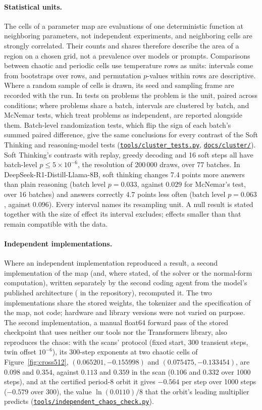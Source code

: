 \documentclass[11pt,letterpaper]{article}
\newcommand{\repourl}{https://github.com/tdj28/neural-shrimp}
\newcommand{\reporef}{arxiv-v1}
\newcommand{\repo}[1]{\href{\repourl/blob/\reporef/#1}{\nolinkurl{#1}}}
\begin{document}
\paragraph{Statistical units.} The cells of a parameter map are evaluations of one deterministic function at
neighboring parameters, not independent experiments, and neighboring cells are strongly correlated. Their counts and
shares therefore describe the area of a region on a chosen grid, not a prevalence over models or prompts. Comparisons
between chaotic and periodic cells use temperature rows as units: intervals come from bootstraps over rows, and
permutation $p$-values within rows are descriptive. Where a random sample of cells is drawn, its seed and sampling
frame are recorded with the run. In tests on problems the problem is the unit, paired across conditions; where
problems share a batch, intervals are clustered by batch, and McNemar tests, which treat problems as independent, are
reported alongside them. Batch-level randomization tests, which flip the sign of each batch's summed paired
difference, give the same conclusions for every contrast of the Soft Thinking and reasoning-model tests
(\repo{tools/cluster_tests.py}, \repo{docs/cluster/}). Soft Thinking's contrasts with replay, greedy decoding and
16 soft steps all have batch-level $p\le5\times10^{-6}$, the resolution of 200\,000 draws, over 77 batches. In
DeepSeek-R1-Distill-Llama-8B, soft thinking changes 7.4 points more answers than plain reasoning (batch level
$p=0.033$, against $0.029$ for McNemar's test, over 16 batches) and answers correctly 4.7 points less often (batch
level $p=0.063$, against $0.096$). Every interval names its resampling unit. A null result is stated together with the size of
effect its interval excludes; effects smaller than that remain compatible with the data.

\paragraph{Independent implementations.} Where an independent implementation reproduced a result, a second
implementation of the map (and, where stated, of the solver or the normal-form computation), written separately by the
second coding agent from the model's published architecture ( in the repository), recomputed it.
The two implementations share the stored weights, the tokenizer and the specification of the map, not code; hardware and
library versions were not varied on purpose. The second implementation, a manual float64 forward pass of the stored
checkpoint that uses neither our tools nor the Transformers library, also reproduces the chaos: with the scans' protocol
(fixed start, 300 transient steps, twin offset $10^{-6}$), its 300-step exponents at two chaotic cells of
Figure~\ref{fig:cross512}, $(0.065201,-0.155998)$ and $(0.075475,-0.133454)$, are $0.098$ and $0.354$, against
$0.113$ and $0.359$ in the scan ($0.106$ and $0.332$ over 1000 steps), and at the certified period-8 orbit it gives
$-0.564$ per step over 1000 steps ($-0.579$ over 300), the value $\ln(0.0110)/8$ that the orbit's leading multiplier
predicts (\repo{tools/independent_chaos_check.py}).
\end{document}
